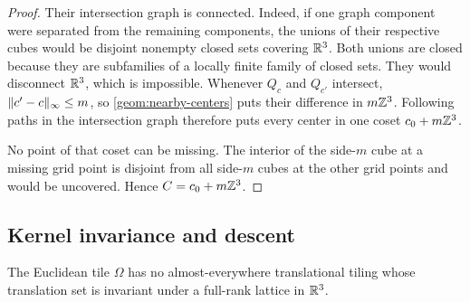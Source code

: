 \begin{proof}
Their intersection graph is connected.  Indeed, if one graph
component were separated from the remaining components, the unions
of their respective cubes would be disjoint nonempty closed sets
covering $\mathbb R^3$.  Both unions are closed because they are subfamilies
of a locally finite family of closed sets.  They would disconnect
$\mathbb R^3$, which is impossible.  Whenever $Q_c$ and $Q_{c'}$ intersect,
$\lVert c'-c\rVert_\infty\leq m$, so \cref{geom:nearby-centers} puts their
difference in $m\mathbb Z^3$.  Following paths in the intersection graph
therefore puts every center in one coset $c_0+m\mathbb Z^3$.

No point of that coset can be missing.  The interior of the
side-$m$ cube at a missing grid point is disjoint from all side-$m$
cubes at the other grid points and would be uncovered.  Hence
$C=c_0+m\mathbb Z^3$.
\end{proof}

\subsection{Kernel invariance and descent}

\begin{proposition}
\label{geom:no-periodic}
The Euclidean tile $\Omega$ has no almost-everywhere translational
tiling whose translation set is invariant under a full-rank lattice
in $\mathbb R^3$.
\end{proposition}

